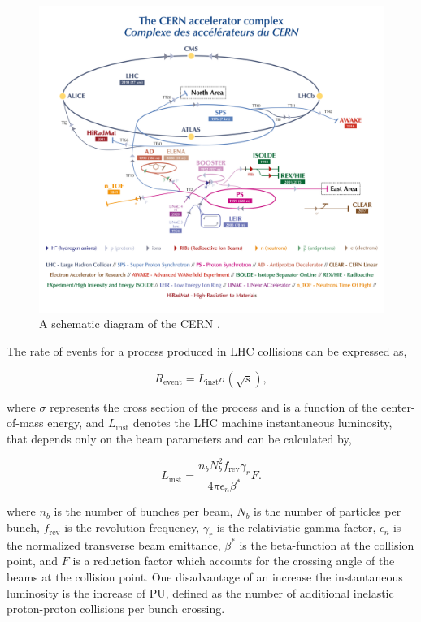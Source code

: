 \begin{figure}[t]
    \centering
    \includegraphics[width=\textwidth]{Figures/cern.png}
    \caption{A schematic diagram of the CERN  \cite{Bartosik:2847538}.}
    \label{fig:CERN_Schematic}
\end{figure}

The rate of events for a process produced in \ac{LHC} collisions can be expressed as,

\begin{equation}
R_{\text{event}} = L_{\text{inst}} \sigma(\sqrt{s}), 
\end{equation}

where $\sigma$ represents the cross section of the process and is a function of the center-of-mass energy, and $L_{\text{inst}}$ denotes the \ac{LHC} machine instantaneous luminosity, that depends only on the beam parameters and can be calculated by,

\begin{equation}
L_{\text{inst}} = \frac{n_{b}N_{b}^{2}f_{\text{rev}}\gamma_{r}}{4\pi \epsilon_{n}\beta^{*}}F.
\end{equation}

where $n_b$ is the number of bunches per beam, $N_b$ is the number of particles per bunch, $f_{\text{rev}}$ is the revolution frequency, $\gamma_r$ is the relativistic gamma factor, $\epsilon_n$ is the normalized transverse beam emittance, $\beta^*$ is the beta-function at the collision point, and $F$ is a reduction factor which accounts for the crossing angle of the beams at the collision point. 
One disadvantage of an increase the instantaneous luminosity is the increase of \ac{PU}, defined as the number of additional inelastic proton-proton collisions per bunch crossing. \\

